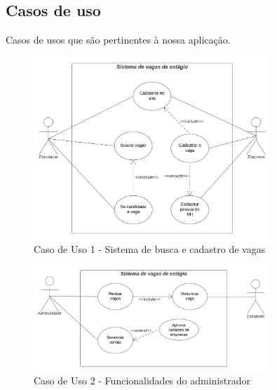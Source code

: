 \subsection{Casos de uso}

Casos de usos que são pertinentes à nossa aplicação.
\begin{figure}[H]
	\centering 
	\caption{\label{fig:caso1}Caso de Uso 1 - Sistema de busca e cadastro de vagas}
	\includegraphics[width=0.8\textwidth]{imagens/caso-de-uso-1.png} 
\end{figure}

\begin{figure}[H]
	\centering 
	\caption{\label{fig:caso1}Caso de Uso 2 - Funcionalidades do administrador}
	\includegraphics[width=0.8\textwidth]{imagens/caso-de-uso-2.png} 
\end{figure}


